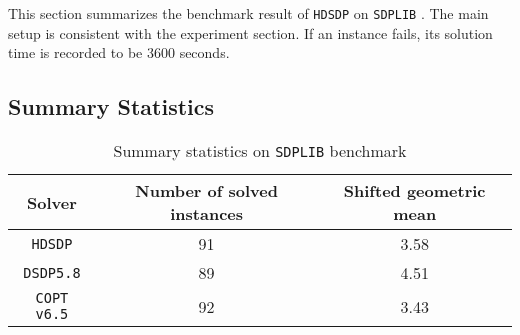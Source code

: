 This section summarizes the benchmark result of \texttt{HDSDP} on \texttt{SDPLIB} \cite{borchers1999sdplib}. The main setup is consistent with the experiment section. If an instance fails, its solution time is recorded to be 3600 seconds.

\subsection{Summary Statistics}

\begin{table}[H]
\caption{Summary statistics on \texttt{SDPLIB} benchmark}
  \begin{tabular}{ccc}
  \toprule
  Solver & Number of solved instances & Shifted geometric mean \\
  \midrule
  \texttt{HDSDP} & 91 & 3.58 \\
    \texttt{DSDP5.8} & 89 & 4.51 \\
    \texttt{COPT v6.5} & 92 & 3.43 \\
  	\bottomrule
  \end{tabular}	
\end{table}

